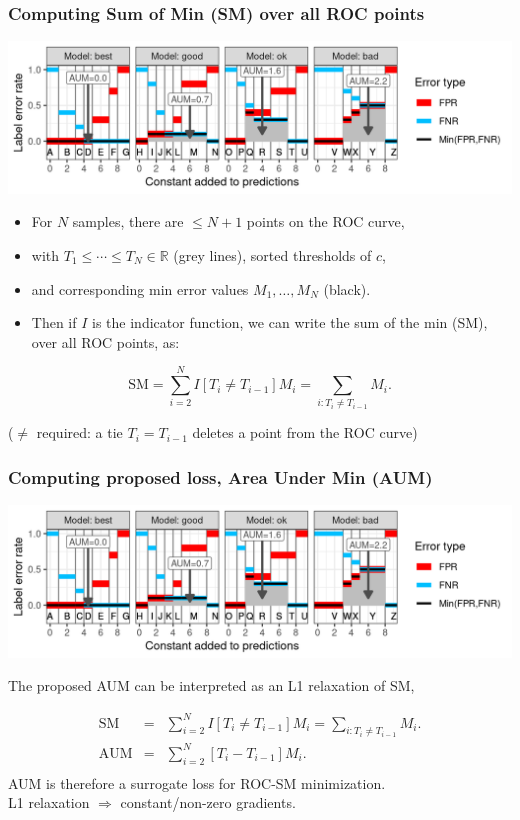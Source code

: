 \documentclass[t]{beamer}
\begin{document}
\begin{frame}
  \frametitle{Computing Sum of Min (SM) over all ROC points}
  \includegraphics[width=\textwidth]{figure-more-than-one-new-binary-aum-rate}
  \vskip -0.2cm
  \begin{itemize}
  \item For $N$ samples, there are $\leq N+1$ points on the ROC curve,
  \item with $T_1\leq\cdots\leq T_N\in\mathbb R$ (grey lines), sorted thresholds of $c$, 
  \item and corresponding min error values $M_1,\dots,M_N$ (black).
  \item Then if $I$ is the indicator function, we can write the sum of
    the min (SM), over all ROC points, as:
  \end{itemize}
\begin{equation*}
  \label{eq:SM-computation}
    \text{SM} =
    \sum_{i=2}^{N}
    I[ T_{i} \neq T_{i-1} ]
    M_i =
    \sum_{i:T_{i} \neq T_{i-1} }
    M_i.
\end{equation*}

($\neq$ required: a tie $T_i=T_{i-1}$ deletes a point from the ROC curve)

\end{frame}

\begin{frame}
  \frametitle{Computing proposed loss, Area Under Min (AUM)}
  \includegraphics[width=\textwidth]{figure-more-than-one-new-binary-aum-rate}

The proposed AUM can be interpreted as an L1 relaxation of SM,

\begin{eqnarray*}
    \text{SM} &=&
    \sum_{i=2}^{N}
    I[ T_{i} \neq T_{i-1} ]
    M_i =
    \sum_{i:T_{i} \neq T_{i-1} }
                  M_i.
                                    \\
    \text{AUM} &=&
    \sum_{i=2}^{N}
    [ T_{i} - T_{i-1} ]
                   M_i.\\
\end{eqnarray*}
AUM is therefore a surrogate loss for ROC-SM minimization.\\
L1 relaxation $\Rightarrow$ constant/non-zero gradients.
\end{frame}
\end{document}
